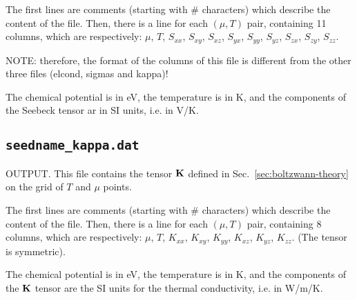 The first lines are comments (starting with \# characters) which describe the content of the file.
Then, there is a line for each $(\mu,T)$ pair, containing 11 columns, which are respectively: $\mu$, $T$, $S_{xx}$, $S_{xy}$, $S_{xz}$, $S_{yx}$, $S_{yy}$, $S_{yz}$, $S_{zx}$, $S_{zy}$, $S_{zz}$.

NOTE: therefore, the format of the columns of this file is different from the other three files (elcond, sigmas and kappa)!

The chemical potential is in eV, the temperature is in K, and the components of the Seebeck tensor ar in SI units, i.e. in V/K.

\subsection{{\tt seedname\_kappa.dat}}
OUTPUT. This file contains the tensor $\bm{\mathrm{K}}$ defined in Sec.~\ref{sec:boltzwann-theory} on the grid of $T$ and $\mu$ points.

The first lines are comments (starting with \# characters) which describe the content of the file.
Then, there is a line for each $(\mu,T)$ pair, containing 8 columns, which are respectively: $\mu$, $T$, $K_{xx}$, $K_{xy}$, $K_{yy}$, $K_{xz}$, $K_{yz}$, $K_{zz}$. (The tensor is symmetric).

The chemical potential is in eV, the temperature is in K, and the components of the $\bm{\mathrm{K}}$ tensor are the SI units for the thermal conductivity, i.e. in W/m/K.





